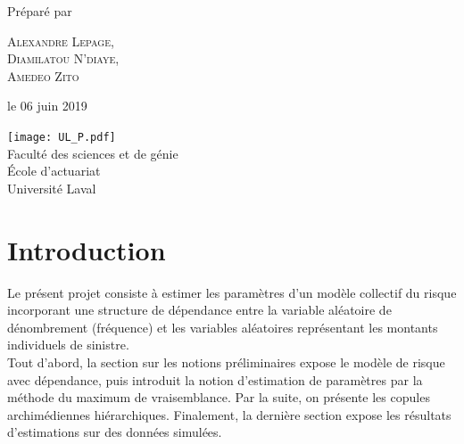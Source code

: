 \documentclass{article}
\begin{document}
\begin{titlepage}
		Préparé par
		
		\vspace{0.5\baselineskip} %
		
		{\scshape\Large Alexandre Lepage, \\
			Diamilatou N'diaye, \\ Amedeo Zito \\} %
		
		\vspace*{5\baselineskip}
		
		le 06 juin 2019
		
		\vspace{0.5\baselineskip} %
		
		\vfill %
		
		
		\texttt{[image: UL\_P.pdf]}\\
		
		Faculté des sciences et de génie\\
		École d'actuariat\\
		Université Laval\\       
		
	\end{titlepage}
	
	\setcounter{page}{0}
	
	\newpage
	\strut %
	\newpage
	
	\tableofcontents
	\newpage
	\renewcommand{\listfigurename}{Liste des illustrations}
	\listoffigures
	\newpage
	\listoftables
	\newpage
	
	\setcounter{page}{1}
	
	\section{Introduction}
	Le présent projet consiste à estimer les paramètres d'un modèle collectif du risque incorporant une structure de dépendance entre la variable aléatoire de dénombrement (fréquence) et les variables aléatoires représentant les montants individuels de sinistre.\\
	
	Tout d'abord, la section sur les notions préliminaires expose le modèle de risque avec dépendance, puis introduit la notion d'estimation de paramètres par la méthode du maximum de vraisemblance. Par la suite, on présente les copules archimédiennes hiérarchiques.
	Finalement, la dernière section expose les résultats d'estimations sur des données simulées.
	
\end{document}

